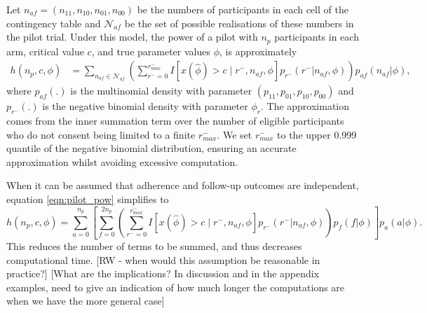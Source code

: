 \documentclass[AMA,STIX1COL]{WileyNJD-v2}
\begin{document}
Let $n_{af} = (n_{11}, n_{10}, n_{01}, n_{00})$ be the numbers of participants in each cell of the contingency table and $\mathcal{N}_{af}$ be the set of possible realisations of these numbers in the pilot trial. Under this model, the power of a pilot with $n_p$ participants in each arm, critical value $c$, and true parameter values $\phi$, is approximately
\begin{align}\label{eqn:pilot_pow}
h(n_p, c, \phi) &= \sum_{n_{af} \in \mathcal{N}_{af}} \left( \sum_{r^- = 0}^{r^-_{max}} 
I \left[ x(\hat{\phi}) > c \mid  r^-, n_{af}, \phi \right] p_{r^-}(r^- | n_{af}, \phi) \right)     
p_{af}(n_{af} |\phi),
\end{align}
where $p_{af}(.)$ is the multinomial density with parameter $(p_{11}, p_{01}, p_{10}, p_{00})$ and  $p_{r^-}(.)$ is the negative binomial density with parameter $\phi_r$. The approximation comes from the inner summation term over the number of eligible participants who do not consent being limited to a finite $r^-_{max}$. We set  $r^-_{max}$ to the upper 0.999 quantile of the negative binomial distribution, ensuring an accurate approximation whilst avoiding excessive computation.

When it can be assumed that adherence and follow-up outcomes are independent, equation \ref{eqn:pilot_pow} simplifies to
\begin{equation*}
h(n_p, c, \phi) = \sum_{a=0}^{n_p} \left[  \sum_{f=0}^{2n_p} \left( \sum_{r^- = 0}^{r^-_{max}} 
I \left[ x(\hat{\phi}) > c \mid  r^-, n_{af}, \phi \right] p_{r^-}(r^- | n_{af}, \phi) \right) p_{f}(f |\phi)  \right] p_a(a | \phi).
\end{equation*}
This reduces the number of terms to be summed, and thus decreases computational time. [RW - when would this assumption be reasonable in practice?] [What are the implications? In discussion and in the appendix examples, need to give an indication of how much longer the computations are when we have the more general case]

\end{document}
